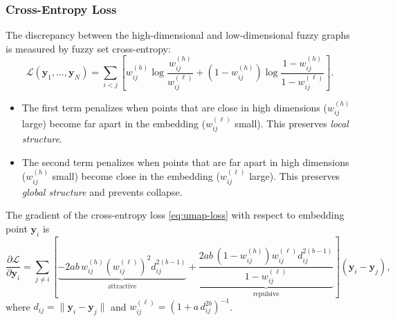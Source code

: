 \subsubsection{Cross-Entropy Loss}

The discrepancy between the high-dimensional and low-dimensional fuzzy graphs is measured by fuzzy set cross-entropy:
\begin{equation}\label{eq:umap-loss}
  \mathcal{L}(\mathbf{y}_1, \dots, \mathbf{y}_N) = \sum_{i < j} \left[ w_{ij}^{(h)} \log\frac{w_{ij}^{(h)}}{w_{ij}^{(\ell)}} + (1 - w_{ij}^{(h)}) \log\frac{1 - w_{ij}^{(h)}}{1 - w_{ij}^{(\ell)}} \right].
\end{equation}

\begin{remark}\leavevmode
  \begin{itemize}
    \item The first term penalizes when points that are close in high dimensions ($w_{ij}^{(h)}$ large) become far apart in the embedding ($w_{ij}^{(\ell)}$ small). This preserves \emph{local structure}.
    \item The second term penalizes when points that are far apart in high dimensions ($w_{ij}^{(h)}$ small) become close in the embedding ($w_{ij}^{(\ell)}$ large). This preserves \emph{global structure} and prevents collapse.
  \end{itemize}
\end{remark}

\begin{theorem}\label{thm:umap-gradient}
  The gradient of the cross-entropy loss \eqref{eq:umap-loss} with respect to embedding point $\mathbf{y}_i$ is
  \begin{equation}\label{eq:umap-gradient}
    \frac{\partial \mathcal{L}}{\partial \mathbf{y}_i} = \sum_{j \neq i} \left[ \underbrace{-2ab \, w_{ij}^{(h)} \left(w_{ij}^{(\ell)}\right)^2 d_{ij}^{2(b-1)}}_{\text{attractive}}  + \underbrace{\frac{2ab \, (1-w_{ij}^{(h)}) w_{ij}^{(\ell)} d_{ij}^{2(b-1)}}{1 - w_{ij}^{(\ell)}}}_{\text{repulsive}} \right] (\mathbf{y}_i - \mathbf{y}_j),
  \end{equation}
  where $d_{ij} = \|\mathbf{y}_i - \mathbf{y}_j\|$ and $w_{ij}^{(\ell)} = (1 + a \, d_{ij}^{2b})^{-1}$.
\end{theorem}

